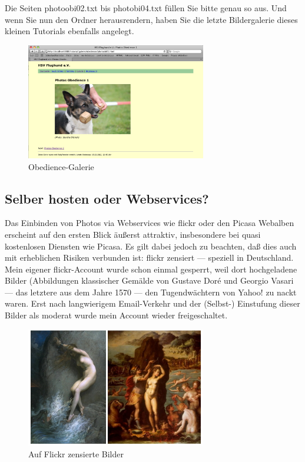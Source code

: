 \documentclass[11pt]{report}
\begin{document}
Die Seiten photoobi02.txt bis photobi04.txt füllen Sie bitte genau so
aus. Und wenn Sie nun den Ordner herausrendern, haben Sie die letzte
Bildergalerie dieses kleinen Tutorials ebenfalls angelegt.

\begin{figure}[h!]
\centering
\includegraphics[width=0.7\textwidth]{./images/galerie08.png}
\caption{\label{galerie08}Obedience-Galerie}
\end{figure}
\subsection{Selber hosten oder Webservices?}
\label{sec-2-4-1-3}


Das Einbinden von Photos via Webservices wie flickr oder den Picasa
Webalben erscheint auf den ersten Blick äußerst attraktiv,
insbesondere bei quasi kostenlosen Diensten wie Picasa. Es gilt dabei
jedoch zu beachten, daß dies auch mit erheblichen Risiken verbunden
ist: flickr zensiert — speziell in Deutschland. Mein eigener
flickr-Account wurde schon einmal gesperrt, weil dort hochgeladene
Bilder (Abbildungen klassischer Gemälde von Gustave Doré und Georgio
Vasari — das letztere aus dem Jahre 1570 — den Tugendwächtern von
Yahoo! zu nackt waren. Erst nach langwierigem Email-Verkehr und der
(Selbst-) Einstufung dieser Bilder als moderat wurde mein Account
wieder freigeschaltet.

\begin{figure}[h!]
\centering
\includegraphics[width=0.7\textwidth]{./images/zensur.png}
\caption{\label{zensur}Auf Flickr zensierte Bilder}
\end{figure}
\end{document}
